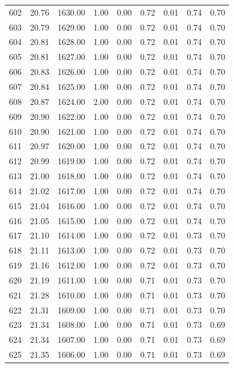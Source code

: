 \documentclass{article}\usepackage[]{graphicx}\usepackage[]{color}
\begin{document}
\begin{longtable}{rrrrrrrrr}
  602 & 20.76 & 1630.00 & 1.00 & 0.00 & 0.72 & 0.01 & 0.74 & 0.70 \\ 
  603 & 20.79 & 1629.00 & 1.00 & 0.00 & 0.72 & 0.01 & 0.74 & 0.70 \\ 
  604 & 20.81 & 1628.00 & 1.00 & 0.00 & 0.72 & 0.01 & 0.74 & 0.70 \\ 
  605 & 20.81 & 1627.00 & 1.00 & 0.00 & 0.72 & 0.01 & 0.74 & 0.70 \\ 
  606 & 20.83 & 1626.00 & 1.00 & 0.00 & 0.72 & 0.01 & 0.74 & 0.70 \\ 
  607 & 20.84 & 1625.00 & 1.00 & 0.00 & 0.72 & 0.01 & 0.74 & 0.70 \\ 
  608 & 20.87 & 1624.00 & 2.00 & 0.00 & 0.72 & 0.01 & 0.74 & 0.70 \\ 
  609 & 20.90 & 1622.00 & 1.00 & 0.00 & 0.72 & 0.01 & 0.74 & 0.70 \\ 
  610 & 20.90 & 1621.00 & 1.00 & 0.00 & 0.72 & 0.01 & 0.74 & 0.70 \\ 
  611 & 20.97 & 1620.00 & 1.00 & 0.00 & 0.72 & 0.01 & 0.74 & 0.70 \\ 
  612 & 20.99 & 1619.00 & 1.00 & 0.00 & 0.72 & 0.01 & 0.74 & 0.70 \\ 
  613 & 21.00 & 1618.00 & 1.00 & 0.00 & 0.72 & 0.01 & 0.74 & 0.70 \\ 
  614 & 21.02 & 1617.00 & 1.00 & 0.00 & 0.72 & 0.01 & 0.74 & 0.70 \\ 
  615 & 21.04 & 1616.00 & 1.00 & 0.00 & 0.72 & 0.01 & 0.74 & 0.70 \\ 
  616 & 21.05 & 1615.00 & 1.00 & 0.00 & 0.72 & 0.01 & 0.74 & 0.70 \\ 
  617 & 21.10 & 1614.00 & 1.00 & 0.00 & 0.72 & 0.01 & 0.73 & 0.70 \\ 
  618 & 21.11 & 1613.00 & 1.00 & 0.00 & 0.72 & 0.01 & 0.73 & 0.70 \\ 
  619 & 21.16 & 1612.00 & 1.00 & 0.00 & 0.72 & 0.01 & 0.73 & 0.70 \\ 
  620 & 21.19 & 1611.00 & 1.00 & 0.00 & 0.71 & 0.01 & 0.73 & 0.70 \\ 
  621 & 21.28 & 1610.00 & 1.00 & 0.00 & 0.71 & 0.01 & 0.73 & 0.70 \\ 
  622 & 21.31 & 1609.00 & 1.00 & 0.00 & 0.71 & 0.01 & 0.73 & 0.70 \\ 
  623 & 21.34 & 1608.00 & 1.00 & 0.00 & 0.71 & 0.01 & 0.73 & 0.69 \\ 
  624 & 21.34 & 1607.00 & 1.00 & 0.00 & 0.71 & 0.01 & 0.73 & 0.69 \\ 
  625 & 21.35 & 1606.00 & 1.00 & 0.00 & 0.71 & 0.01 & 0.73 & 0.69 \\ 

\end{longtable}
\end{document}
